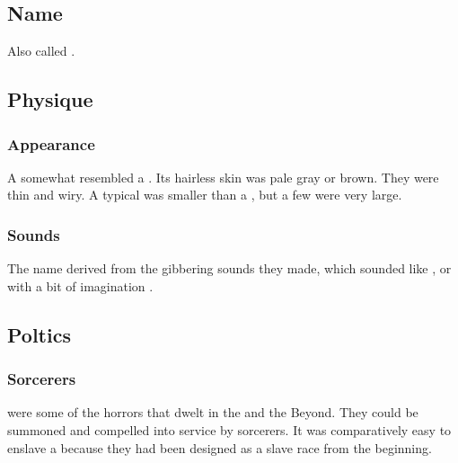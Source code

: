 \subsection{Name}
Also called .









\subsection{Physique}





\subsubsection{Appearance}
A \glithid somewhat resembled a \human.
Its hairless skin was pale gray or brown.
They were thin and wiry.
A typical \glithid was smaller than a \human, but a few were very large. 





\subsubsection{Sounds}
The name \quo{\glithid} derived from the gibbering sounds they made, which sounded like , or with a bit of imagination . 









\subsection{Poltics}





\subsubsection{Sorcerers}
\Glithids were some of the horrors that dwelt in the \wylde and the Beyond. 
They could be summoned and compelled into service by sorcerers.
It was comparatively easy to enslave a \glithid because they had been designed as a slave race from the beginning.









